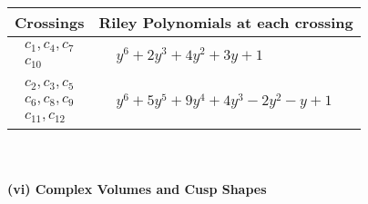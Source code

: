 \documentclass[1p]{elsarticle_modified}
\theoremstyle{definition}
\begin{document}
\begin{tabular}{m{50pt}|m{274pt}}
Crossings & \hspace{64pt}Riley Polynomials at each crossing \\
\hline $$\begin{aligned}c_{1},c_{4},c_{7}\\c_{10}\end{aligned}$$&$\begin{aligned}
&y^6+2 y^3+4 y^2+3 y+1
\end{aligned}$\\
\hline $$\begin{aligned}c_{2},c_{3},c_{5}\\c_{6},c_{8},c_{9}\\c_{11},c_{12}\end{aligned}$$&$\begin{aligned}
&y^6+5 y^5+9 y^4+4 y^3-2 y^2- y+1
\end{aligned}$\\
\hline
\end{tabular}\\~\\
\newpage\flushleft \textbf{(vi) Complex Volumes and Cusp Shapes}
\end{document}
